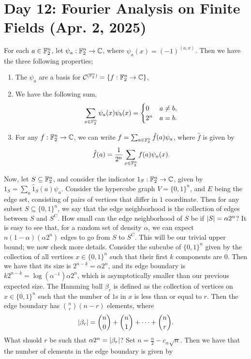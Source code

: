 \section{Day 12: Fourier Analysis on Finite Fields (Apr. 2, 2025)}
For each $a \in \mathbb F_2^n$, let $\psi_a : \mathbb F_2^n \to \mathbb C$, where $\psi_a(x) = (-1)^{\left<a, x\right>}$. Then we have the three following properties;
\begin{enumerate}[label=(\roman*)]
    \item The $\psi_a$ are a basis for $\mathcal C^{(\mathbb F_2^n)} = \{f : \mathbb F_2^n \to \mathbb C\}$,
    \item We have the following sum,
    \[ \sum_{x \in \mathbb F_2^n} \psi_a(x) \psi_b(x) = \begin{cases} 0 & a \neq b, \\ 2^n & a = b. \end{cases} \]
    \item For any $f : \mathbb F_2^n \to \mathbb C$, we can write $f = \sum_{a \in \mathbb F_2^n} \hat{f}(a) \psi_a$, where $\hat{f}$ is given by
    \[ \hat{f}(a) = \frac{1}{2^n} \sum_{x \in \mathbb F_2^n} f(a) \psi_a(x). \]
\end{enumerate}
Now, let $S \subseteq \mathbb F_2^n$, and consider the indicator $1_S : \mathbb F_2^n \to \mathbb C$, given by $1_S = \sum_a \hat{1}_S(a) \psi_a$. Consider the hypercube graph $V = \{0, 1\}^n$, and $E$ being the edge set, consisting of pairs of vertices that differ in $1$ coordinate. Then for any subset $S \subseteq \{0, 1\}^n$, we say that the edge neighborhood is the collection of edges between $S$ and $S^C$. How small can the edge neighborhood of $S$ be if $\left\lvert S \right\rvert = \alpha 2^n$? It is easy to see that, for a random set of density $\alpha$, we can expect $n(1 - \alpha)(\alpha 2^n)$ edges to go from $S$ to $S^C$. This will be our trivial upper bound; we now check more details.
\medskip\newline
Consider the subcube of $\{0, 1\}^n$ given by the collection of all vertices $x \in \{0, 1\}^n$ such that their first $k$ components are $0$. Then we have that its size is $2^{n-k} = \alpha 2^n$, and its edge boundary is $k 2^{n-k} = \log (\alpha^{-1}) \alpha 2^n$, which is asymptotically smaller than our previous expected size.
\medskip\newline
The Hamming ball $\beta_r$ is defined as the collection of vertices on $x \in \{0, 1\}^n$ such that the number of $1$s in $x$ is less than or equal to $r$. Then the edge boundary has $\binom{n}{r} (n - r)$ elements, where
\[ \left\lvert \beta_r \right\rvert = \binom{n}{0} + \binom{n}{1} + \dots + \binom{n}{r}. \]
What shuold $r$ be such that $\alpha 2^n = \left\lvert \beta_r \right\rvert$? Set $n = \frac{n}{2} - c_\alpha \sqrt{n}$. Then we have that the number of elements in the edge boundary is given by
